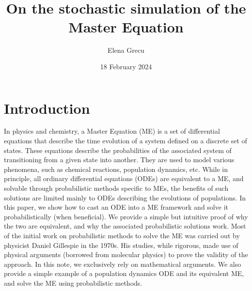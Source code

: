 \documentclass[12pt]{article}
\title{On the stochastic simulation of the Master Equation}
\author{Elena Grecu}
\date{18 February 2024}
\begin{document}
\maketitle
\section{Introduction}
In physics and chemistry, a Master Equation (ME) is a set of differential equations that describe the time evolution of a system defined on a discrete set of states. These equations describe the probabilities of the associated system of transitioning from a given state into another. They are used to model various phenomena, such as chemical reactions, population dynamics, etc. While in principle, all ordinary differential equations (ODEs) are equivalent to a ME, and solvable through probabilistic methods specific to MEs, the benefits of such solutions are limited mainly to ODEs describing the evolutions of populations. In this paper, we show how to cast an ODE into a ME framework and solve it probabilistically (when beneficial). We provide a simple but intuitive proof of why the two are equivalent, and why the associated probabilistic solutions work. Most of the initial work on probabilistic methods to solve the ME was carried out by physicist Daniel Gillespie in the 1970s. His studies, while rigorous, made use of physical arguments (borrowed from molecular physics) to prove the validity of the approach. In this note, we exclusively rely on mathematical arguments. We also provide a simple example of a population dynamics ODE and its equivalent ME, and solve the ME using probabilistic methods.  
\end{document}
